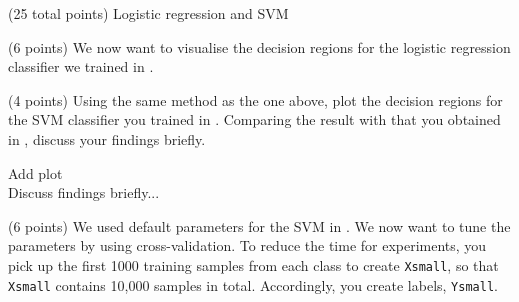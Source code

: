 \documentclass[12pt]{article}
\begin{document}
\begin{question}{(25 total points) Logistic regression and SVM}
\begin{subquestion}{(6 points)
       We now want to visualise the decision regions for the logistic
       regression classifier we trained in .
     }
   \end{subquestion}
   \begin{subquestion}{(4 points)
       Using the same method as the one above, plot the decision regions for
       the SVM classifier you trained in .
       Comparing the result with that you obtained in , discuss your
       findings briefly.
     } \label{Q2.4}
   

      \begin{answerbox}{35em}
         Add plot\\
        Discuss findings briefly...
      \end{answerbox}
  


   \end{subquestion}

   \begin{subquestion}{(6 points)
       We used default parameters for the SVM in .
       We now want to tune the parameters by using cross-validation.
       To reduce the time for experiments, you pick up the first 1000
       training samples from each class to create \texttt{Xsmall}, so that \texttt{Xsmall}
       contains 10,000 samples in total. Accordingly, you create
       labels, \texttt{Ysmall}.
     } \label{Q2.5}


   


\end{subquestion}
\end{question}
\end{document}
